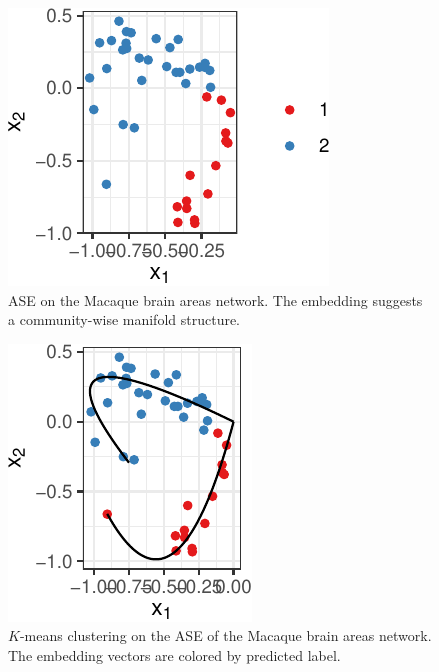 \documentclass[
  12pt,
]{article}
\theoremstyle{definition}
\theoremstyle{definition}
\theoremstyle{definition}
\theoremstyle{definition}
\theoremstyle{remark}
\begin{document}
\begin{figure}[H]

{\centering \includegraphics{draft_files/figure-latex/macaque-ase-1} 

}

\caption{ASE on the Macaque brain areas network. The embedding suggests a community-wise manifold structure.}\label{fig:macaque-ase}
\end{figure}

\begin{figure}[H]

{\centering \includegraphics{draft_files/figure-latex/macaque-fitted-1} 

}

\caption{$K$-means clustering on the ASE of the Macaque brain areas network. The embedding vectors are colored by predicted label.}\label{fig:macaque-fitted}
\end{figure}
\end{document}

